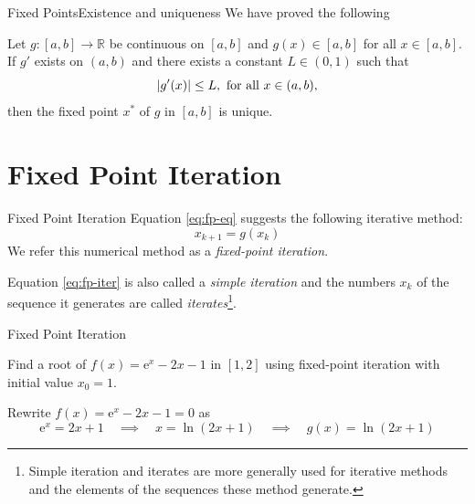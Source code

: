 \documentclass[12pt,aspectratio=169]{beamer}
\DeclarePairedDelimiter{\abs}{\lvert}{\rvert}
\begin{document}
\begin{frame}{Fixed Points}{Existence and uniqueness}
  We have proved the following
  \begin{theorem}
    Let $g : [a,b] \to \mathbb{R}$ be continuous on $[a,b]$ and $g(x) \in [a,b]$
    for all $x \in [a,b]$.
    If $g'$ exists on $(a,b)$ and there exists a constant $L \in (0,1)$ such
    that
    \[
      \abs{g'(x)} \leq L,\ \text{for all}\ x \in (a,b),
    \]
    then the fixed point $x^*$ of $g$ in $[a,b]$ is unique.
  \end{theorem}
\end{frame}

\section{Fixed Point Iteration}
\begin{frame}{Fixed Point Iteration}
  \label{fr:fp-iter-def}
  Equation \eqref{eq:fp-eq} suggests the following iterative method:
  \begin{equation} \label{eq:fp-iter}
    x_{k+1} = g(x_k)
  \end{equation}
  We refer this numerical method as a \emph{fixed-point iteration}.

  Equation \eqref{eq:fp-iter} is also called a \emph{simple iteration} and the
  numbers $x_k$ of the sequence it generates are called
  \emph{iterates}\footnote{Simple iteration and iterates are more generally used
  for iterative methods and the elements of the sequences these method
  generate.}.
\end{frame}

\begin{frame}{Fixed Point Iteration}
  \begin{example}
    Find a root of $f(x) = \mathrm{e}^x - 2x - 1$ in $[1,2]$ using fixed-point
    iteration with initial value $x_0 = 1$.
  \end{example}
  Rewrite $f(x) = \mathrm{e}^x - 2x - 1 = 0$ as
  \[
    \mathrm{e}^x = 2x + 1
    \quad \implies \quad
    x = \ln(2x + 1)
    \quad \implies \quad
    g(x) = \ln(2x + 1)
  \]
  \begin{center}
  \end{center}
\end{frame}
\end{document}
